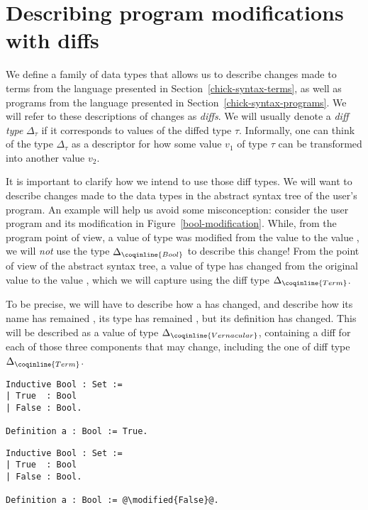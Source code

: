 \section{Describing program modifications with diffs}\label{chick-diffs}

We define a family of data types that allows us to describe changes made to
terms from the language presented in Section~\ref{chick-syntax-terms}, as well
as programs from the language presented in Section~\ref{chick-syntax-programs}.
We will refer to these descriptions of changes as \textit{diffs}.  We will
usually denote a \textit{diff type} $\Delta_{\tau}$ if it corresponds to values
of the diffed type $\tau$.  Informally, one can think of the type
$\Delta_{\tau}$ as a descriptor for how some value $v_{1}$ of type $\tau$ can be
transformed into another value $v_{2}$.

It is important to clarify how we intend to use those diff types.  We will want
to describe changes made to the data types in the abstract syntax tree of the
user's program.  An example will help us avoid some misconception: consider the
user program and its modification in Figure~\ref{bool-modification}.  While,
from the program point of view, a value of type  was modified
from the value  to the value , we will
\emph{not} use the type $\Delta_{\coqinline{Bool}}$ to describe this change!
From the point of view of the abstract syntax tree, a value of type
 has changed from the original value  to
the value , which we will capture using the diff type
$\Delta_{\coqinline{Term}}$.

To be precise, we will have to describe how a  has
changed, and describe how its name has remained , its type has
remained , but its definition has changed.  This will be
described as a value of type $\Delta_{\coqinline{Vernacular}}$, containing a
diff for each of those three components that may change, including the one of
diff type $\Delta_{\coqinline{Term}}$.

\begin{figure*}[!htp]

  \noindent%
  \begin{minipage}[t]{0.50\textwidth}
    \begin{verbatim}
Inductive Bool : Set :=
| True  : Bool
| False : Bool.

Definition a : Bool := True.
\end{verbatim}
\end{minipage}%
\begin{minipage}[t]{0.50\textwidth}
  \begin{verbatim}
Inductive Bool : Set :=
| True  : Bool
| False : Bool.

Definition a : Bool := @\modified{False}@.
\end{verbatim}
\end{minipage}

\caption{A simple program and its modification}

\label{bool-modification}

\end{figure*}

